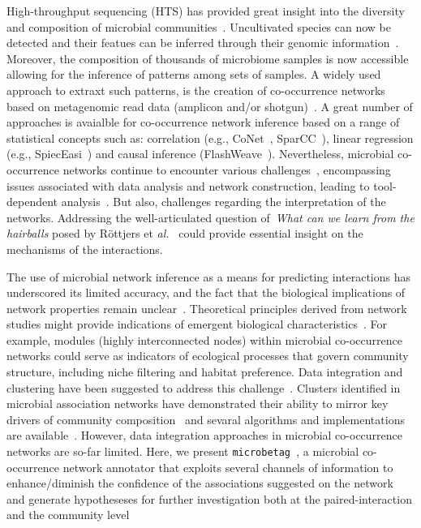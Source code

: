 \documentclass[sn-mathphys,Numbered, lineno]{sn-jnl}  %
\theoremstyle{thmstyleone}%
\theoremstyle{thmstyletwo}%
\theoremstyle{thmstylethree}%
\newcommand{\microbetag}{\texttt{microbetag }}
\begin{document}
    High-throughput sequencing (HTS) has provided great insight into the diversity and composition of microbial communities~\cite{elixir_microbiome}. %
    Uncultivated species can now be detected and their featues can be inferred through their genomic information~\cite{hug2016new}.
    Moreover, the composition of thousands of microbiome samples is now accessible allowing for the inference of patterns among sets of samples.
    A widely used approach to extraxt such patterns, is the creation of co-occurrence networks based on metagenomic read data (amplicon and/or shotgun)~\cite{matchado2021network}. 
    A great number of approaches is avaialble for co-occurrence network inference based on a range of statistical concepts such as: correlation (e.g., CoNet~\cite{faust2012microbial}, SparCC~\cite{friedman2012inferring}), linear regression (e.g., SpiecEasi~\cite{kurtz2015sparse}) and causal inference (FlashWeave~\cite{flashweave_cite}).
    Nevertheless, microbial co-occurrence networks continue to encounter various challenges~\cite{faust2021open}, encompassing issues associated with data analysis and network construction, leading to tool-dependent analysis~\cite{kishore2023inferring, weiss2016correlation, rottjers2018hairballs}.
    But also, challenges regarding the interpretation of the networks.
    Addressing the well-articulated question of~\textit{What can we learn from the hairballs} posed by R{\"o}ttjers et \textit{al.}~\cite{rottjers2018hairballs} could provide essential insight on the mechanisms of the interactions.

    The use of microbial network inference as a means for predicting interactions has underscored its limited accuracy, and the fact that the biological implications of network properties remain unclear~\cite{berry2014deciphering}.
    Theoretical principles derived from network studies might provide indications of emergent biological characteristics~\cite{rottjers2018hairballs, guo2022microbial}. 
    For example, modules (highly interconnected nodes) within microbial co-occurrence networks could serve as indicators of ecological processes that govern community structure, including niche filtering and habitat preference\cite{ma2020earth}.
    Data integration and clustering have been suggested to address this challenge~\cite{faust2021open}.
    Clusters identified in microbial association networks have demonstrated their ability to mirror key drivers of community composition~\cite{guidi2016plankton} and sevaral algorithms and implementations are available~\cite{rottjers2020manta}.
    However, data integration approaches in microbial co-occurrence networks are so-far limited.
    Here, we present \microbetag, a microbial co-occurrence network annotator that exploits several channels of information to enhance/diminish the confidence of the associations suggested on the network and generate hypotheseses for further investigation both at the paired-interaction and the community level
\end{document}
